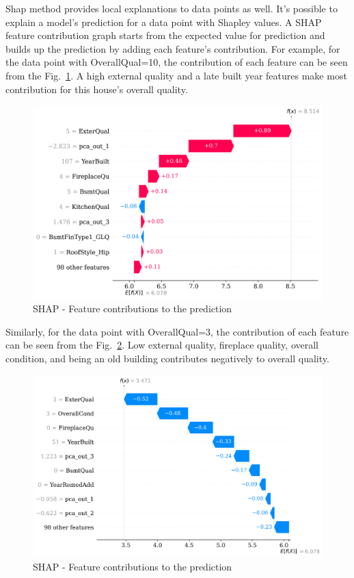 \documentclass[conference]{IEEEtran}
\begin{document}
Shap method provides local explanations to data points as well. It's possible 
to explain a model's prediction for a data point with Shapley values. 
A SHAP feature contribution graph starts from the 
expected value for prediction and builds up the prediction by adding each feature's
contribution.
For example, for the data point with OverallQual=10, 
the contribution of each feature can be seen from the Fig.~\ref{fig:shap-local-10}.
A high external quality and a late built year features make most contribution for this house's overall quality. 
\begin{figure}[htbp]
    \centerline{\includegraphics[width = 0.5 \textwidth]{shap-local-10.png}}
    \caption{SHAP - Feature contributions to the prediction}
    \label{fig:shap-local-10}
\end{figure}

Similarly, for the data point with OverallQual=3, 
the contribution of each feature can be seen from the Fig.~\ref{fig:shap-local-3}.
Low external quality, fireplace quality, overall condition, and being an old building 
contributes negatively to overall quality.
\begin{figure}[htbp]
    \centerline{\includegraphics[width = 0.5 \textwidth]{shap-local-3.png}}
    \caption{SHAP - Feature contributions to the prediction}
    \label{fig:shap-local-3}
\end{figure}
\end{document}

